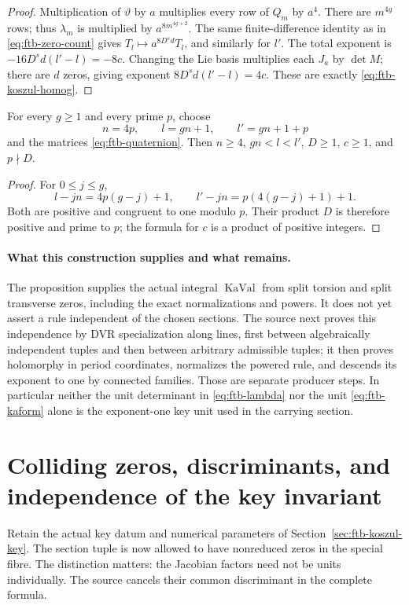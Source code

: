 \begin{proof}
Multiplication of \(\vartheta\) by \(a\) multiplies every row of
\(Q_m\) by \(a^4\).  There are \(m^{4g}\) rows; thus
\(\lambda_m\) is multiplied by \(a^{8m^{4g+2}}\).
The same finite-difference identity as in
\eqref{eq:ftb-zero-count} gives
\(T_l\mapsto a^{8D^sd}T_l\), and similarly for \(l'\).
The total exponent is \(-16D^sd(l'-l)=-8c\).
Changing the Lie basis multiplies each \(J_a\) by \(\det M\);
there are \(d\) zeros, giving exponent
\(8D^sd(l'-l)=4c\).
These are exactly \eqref{eq:ftb-koszul-homog}.
\end{proof}

\begin{srlemma}
\label{lem:ftb-key-numerical-data}
For every \(g\geq1\) and every prime \(p\), choose
\[
 n=4p,\qquad l=gn+1,\qquad l'=gn+1+p
\]
and the matrices \eqref{eq:ftb-quaternion}.
Then \(n\geq4\), \(gn<l<l'\), \(D\geq1\), \(c\geq1\),
and \(p\nmid D\).
\end{srlemma}
\begin{proof}
For \(0\leq j\leq g\),
\[
 l-jn=4p(g-j)+1,\qquad
 l'-jn=p(4(g-j)+1)+1 .
\]
Both are positive and congruent to one modulo \(p\).
Their product \(D\) is therefore positive and prime to \(p\);
the formula for \(c\) is a product of positive integers.
\end{proof}

\paragraph{What this construction supplies and what remains.}
The proposition supplies the actual integral \(\operatorname{KaVal}\)
from split torsion and split transverse zeros, including the exact
normalizations and powers.  It does not yet assert a rule independent
of the chosen sections.  The source next proves this independence by
DVR specialization along lines, first between algebraically independent
tuples and then between arbitrary admissible tuples; it then proves
holomorphy in period coordinates, normalizes the powered rule, and
descends its exponent to one by connected families.
Those are separate producer steps.  In particular neither the unit
determinant in \eqref{eq:ftb-lambda} nor the unit
\eqref{eq:ftb-kaform} alone is the exponent-one key unit used in the
carrying section.

\section{Colliding zeros, discriminants, and independence of the key invariant}
\label{sec:ftb-key-section-independence}
Retain the actual key datum and numerical parameters of
Section~\ref{sec:ftb-koszul-key}.  The section tuple is now allowed to
have nonreduced zeros in the special fibre.  The distinction matters:
the Jacobian factors need not be units individually.
The source cancels their common discriminant in the complete formula.

